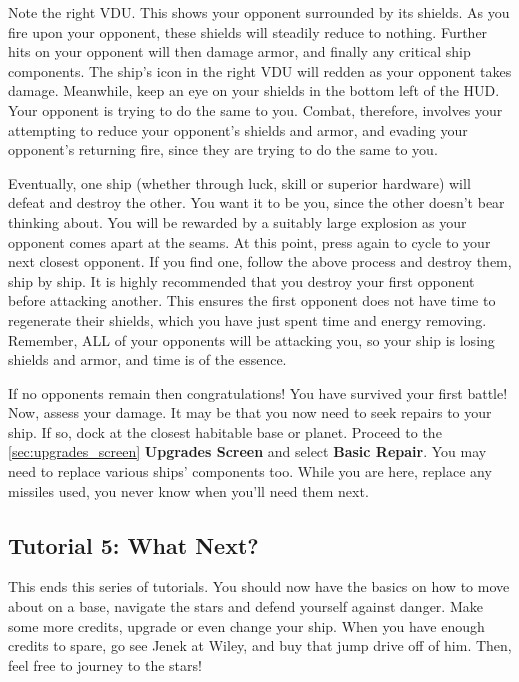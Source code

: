 \documentclass{article}
\newcommand{\key}[1]{%
  \tikz[baseline=(key.base)]{
    \node[draw=gray!50, fill=gray!5, rounded corners=2pt, inner sep=2pt, minimum height=1.5ex] (key) {\footnotesize\sffamily\bfseries #1};
  }%
}
\begin{document}
Note the right VDU. This shows your opponent surrounded by its shields. As you fire upon your opponent, these shields will steadily reduce to nothing. Further hits on your opponent will then damage armor, and finally any critical ship components. The ship's icon in the right VDU will redden as your opponent takes damage. Meanwhile, keep an eye on your shields in the bottom left of the HUD. Your opponent is trying to do the same to you. Combat, therefore, involves your attempting to reduce your opponent's shields and armor, and evading your opponent's returning fire, since they are trying to do the same to you. 

Eventually, one ship (whether through luck, skill or superior hardware) will defeat and destroy the other. You want it to be you, since the other doesn't bear thinking about. You will be rewarded by a suitably large explosion as your opponent comes apart at the seams. At this point, press \key{h} again to cycle to your next closest opponent. If you find one, follow the above process and destroy them, ship by ship. It is highly recommended that you destroy your first opponent before attacking another. This ensures the first opponent does not have time to regenerate their shields, which you have just spent time and energy removing. Remember, ALL of your opponents will be attacking you, so your ship is losing shields and armor, and time is of the essence. 

If no opponents remain then congratulations! You have survived your first battle! Now, assess your damage. It may be that you now need to seek repairs to your ship. If so, dock at the closest habitable base or planet. Proceed to the \ref{sec:upgrades_screen} \textbf{Upgrades Screen} and select \textbf{Basic Repair}. You may need to replace various ships' components too. While you are here, replace any missiles used, you never know when you'll need them next. 

\subsection{ Tutorial 5: What Next? }

This ends this series of tutorials. You should now have the basics on how to move about on a base, navigate the stars and defend yourself against danger. Make some more credits, upgrade or even change your ship.  When you have enough credits to spare, go see Jenek at Wiley, and buy that jump drive off of him. Then, feel free to journey to the stars! 
\end{document}
